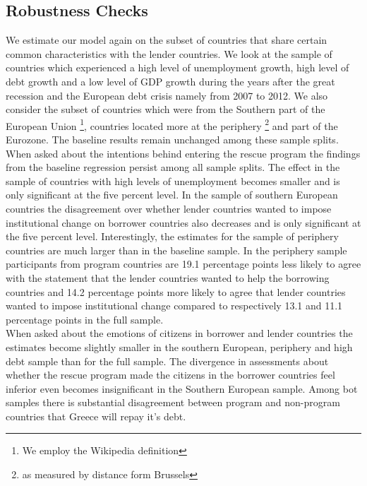 \subsection{Robustness Checks}
We estimate our model again on the subset of countries that share certain common characteristics with the lender countries. We look at the sample of countries which experienced a high level of unemployment growth, high level of debt growth and a low level of GDP growth during the years after the great recession and the European debt crisis namely from 2007 to 2012. We also consider the subset of countries which  were from the Southern part of the European Union \footnote{We employ the Wikipedia definition}, countries located more at the periphery \footnote{as measured by distance form Brussels} and part of the Eurozone. The baseline results remain unchanged among these sample splits.   When asked about the intentions behind entering the rescue program the findings from the baseline regression persist among all sample splits. The effect in the sample of countries with high levels of unemployment becomes smaller and is only significant at the five percent level. In the sample of southern European countries the disagreement over whether lender countries wanted to impose institutional change on borrower countries also decreases and is only significant at the five percent level. Interestingly, the estimates for the sample of periphery countries are much larger than in the baseline sample. In the periphery sample participants from program countries are 19.1 percentage points less likely to agree with the statement that the lender countries wanted to help the borrowing countries and 14.2 percentage points more likely to agree that lender countries wanted to impose institutional change compared to respectively 13.1 and 11.1 percentage points in the full sample.\\
When asked about the emotions of citizens in borrower and lender countries the estimates become slightly smaller in the southern European, periphery and high debt sample than for the full sample. The divergence in assessments about whether the rescue program made the citizens in the borrower countries feel inferior even becomes insignificant in the Southern European sample. Among bot samples there is substantial disagreement between program and non-program countries that Greece will repay it's debt. 
\\

